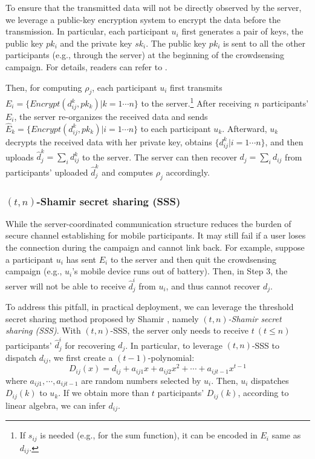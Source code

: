 To ensure that the transmitted data will not be directly observed by the server, we leverage a public-key encryption system to encrypt the data before the transmission. In particular, each participant $u_i$ first generates a pair of keys, the public key $pk_i$ and the private key $sk_i$. The public key $pk_i$ is sent to all the other participants (e.g., through the server) at the beginning of the crowdsensing campaign. For details, readers can refer to \citet{Bonawitz2017PracticalSA}.

Then, for computing $\rho_j$, each participant $u_i$ first transmits $E_i = \{\textit{Encrypt}(d_{ij}^k, pk_k)| k = 1\cdots n\}$ to the server.\footnote{If $s_{ij}$ is needed (e.g., for the sum function), it can be encoded in $E_i$ same as $d_{ij}$.} After receiving $n$ participants' $E_i$, the server re-organizes the received data and sends $\hat E_k = \{\textit{Encrypt}(d_{ij}^k, pk_k)| i = 1\cdots n\}$ to each participant $u_k$. Afterward, $u_k$ decrypts the received data with her private key, obtains $\{d_{ij}^k| i = 1 \cdots n\}$, and then uploads $\hat d_j^k = \sum_i d_{ij}^k$ to the server. The server can then recover $d_j = \sum_i d_{ij}$ from participants' uploaded  $\hat d_j^k$ and computes $\rho_j$ accordingly.

\subsubsection{$(t,n)$-Shamir secret sharing (SSS)} While the server-coordinated communication structure reduces the burden of secure channel establishing for mobile participants. It may still fail if a user loses the connection during the campaign and cannot link back. For example, suppose a participant $u_i$ has sent $E_i$ to the server and then quit the crowdsensing campaign (e.g., $u_i$'s mobile device runs out of battery). Then, in Step 3, the server will not be able to receive $\hat d_j^i$ from $u_i$, and thus cannot recover $d_j$.

To address this pitfall, in practical deployment, we can leverage the threshold secret sharing method proposed by Shamir \citep{shamir1979share}, namely \textit{$(t,n)$-Shamir secret sharing (SSS)}. With $(t,n)$-SSS, the server only needs to receive $t\ (t\le n)$ participants' $\hat d_j^i$ for recovering $d_j$. In particular, to leverage $(t,n)$-SSS to dispatch $d_{ij}$, we first create a $(t-1)$-polynomial: 
\begin{equation}
	D_{ij}(x) = d_{ij}+a_{ij1}x+a_{ij2}x^2+\cdots+a_{ijt-1}x^{t-1}
\end{equation}
where $a_{ij1},\cdots, a_{ijt-1}$ are random numbers selected by $u_i$. Then, $u_i$ dispatches $D_{ij}(k)$ to $u_k$. If we obtain more than $t$ participants' $D_{ij}(k)$, according to linear algebra, we can infer $d_{ij}$.

